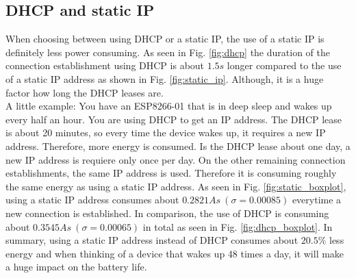 \subsection{DHCP and static IP}
When choosing between using DHCP or a static IP, the use of a static IP is definitely less power consuming.
As seen in Fig. \ref{fig:dhcp} the duration of the connection establishment using DHCP is about $1.5 s$ longer compared to the use of a static IP address as shown in Fig. \ref{fig:static_ip}.
Although, it is a huge factor how long the DHCP leases are.\\
A little example: You have an ESP8266-01 that is in deep sleep and wakes up every half an hour. You are using DHCP to get an IP address.
The DHCP lease is about 20 minutes, so every time the device wakes up, it requires a new IP address. Therefore, more energy is consumed.
Is the DHCP lease about one day, a new IP address is requiere only once per day. On the other remaining connection establishments, the same IP address is used. Therefore it is consuming roughly the same energy as using a static IP address.
As seen in Fig. \ref{fig:static_boxplot}, using a static IP address consumes about $0.2821 As\ (\sigma = 0.00085)$ everytime a new connection is established.
In comparison, the use of DHCP is consuming about $0.3545 As\ (\sigma = 0.00065)$ in total as seen in Fig. \ref{fig:dhcp_boxplot}.
In summary, using a static IP address instead of DHCP consumes about $20.5\%$ less energy and when thinking of a device that wakes up 48 times a day, it will make a huge impact on the battery life.